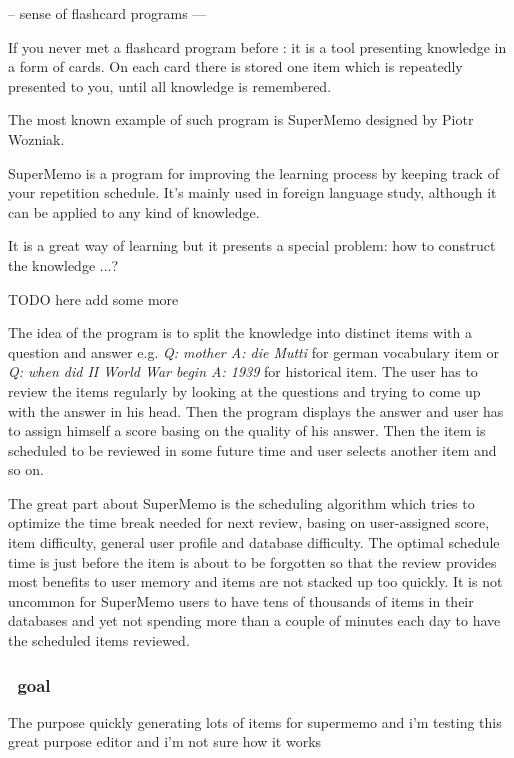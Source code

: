 \documentclass[a4paper,11pt]{article}
\newcommand{\probe}{\emph{\sc{probe{}}}}
\begin{document}
-- sense of flashcard programs ---

If you never met a flashcard program before : it is a tool presenting knowledge
in a form of cards. On each card there is stored one item which is repeatedly
presented to you, until all knowledge is remembered.

The most known example of such program is SuperMemo designed by Piotr Wozniak.


SuperMemo is a program for improving the learning process by keeping track of
your repetition schedule. It's mainly used in foreign language study, although
it can be applied to any kind of knowledge.

It is a great way of learning but it presents a special problem: how to
construct the knowledge ...?

TODO here add some more

The idea of the program is to split the knowledge into distinct items with a
question and answer e.g. \emph{Q: mother A: die Mutti} for german vocabulary
item or \emph{Q: when did II World War begin A: 1939} for historical item.  The
user has to review the items regularly by looking at the questions and trying
to come up with the answer in his head. Then the program displays the answer
and user has to assign himself a score basing on the quality of his answer.
Then the item is scheduled to be reviewed in some future time and user selects
another item and so on.

The great part about SuperMemo is the scheduling algorithm which tries to
optimize the time break needed for next review, basing on user-assigned score,
item difficulty, general user profile and database difficulty. The optimal
schedule time is just before the item is about to be forgotten so that the
review provides most benefits to user memory and items are not stacked up too
quickly.  It is not uncommon for SuperMemo users to have tens of thousands of
items in their databases and yet not spending more than a couple of minutes
each day to have the scheduled items reviewed.




\subsubsection{\probe\ goal}

The purpose quickly generating lots of items for supermemo  and i'm testing
this great purpose editor and i'm not sure how it works
\end{document}
